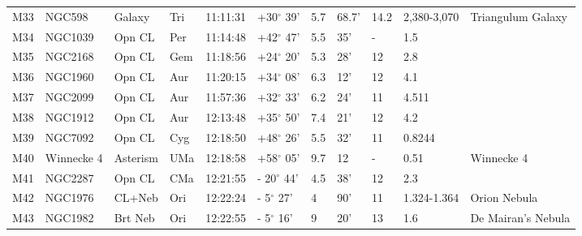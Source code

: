 \documentclass[10pt,twoside,a4paper,english]{article}
\begin{document}
\begin{longtable}{@{}lllllllllll@{}}
M33        & NGC598      & Galaxy     & Tri       & 11:11:31 & +30$^{\circ}$ 39'  & 5.7       & 68.7'                & 14.2     & 2,380-3,070         & Triangulum Galaxy                         \\ 
M34        & NGC1039     & Opn CL     & Per       & 11:14:48 & +42$^{\circ}$ 47'  & 5.5       & 35'                  & -        & 1.5                 &                                           \\ 
M35        & NGC2168     & Opn CL     & Gem       & 11:18:56 & +24$^{\circ}$ 20'  & 5.3       & 28'                  & 12       & 2.8                 &                                           \\ 
M36        & NGC1960     & Opn CL     & Aur       & 11:20:15 & +34$^{\circ}$ 08'  & 6.3       & 12'                  & 12       & 4.1                 &                                           \\ 
M37        & NGC2099     & Opn CL     & Aur       & 11:57:36 & +32$^{\circ}$ 33'  & 6.2       & 24'                  & 11       & 4.511               &                                           \\ 
M38        & NGC1912     & Opn CL     & Aur       & 12:13:48 & +35$^{\circ}$ 50'  & 7.4       & 21'                  & 12       & 4.2                 &                                           \\ 
M39        & NGC7092     & Opn CL     & Cyg       & 12:18:50 & +48$^{\circ}$ 26'  & 5.5       & 32'                  & 11       & 0.8244              &                                           \\ 
M40        & Winnecke 4  & Asterism   & UMa       & 12:18:58 & +58$^{\circ}$ 05'  & 9.7       & 12                   & -        & 0.51                & Winnecke 4                                \\ 
M41        & NGC2287     & Opn CL     & CMa       & 12:21:55 & - 20$^{\circ}$ 44' & 4.5       & 38'                  & 12       & 2.3                 &                                           \\ 
M42        & NGC1976     & CL+Neb     & Ori       & 12:22:24 & - 5$^{\circ}$ 27'  & 4         & 90'                  & 11       & 1.324-1.364         & Orion Nebula                              \\ 
M43        & NGC1982     & Brt Neb    & Ori       & 12:22:55 & - 5$^{\circ}$ 16'  & 9         & 20'                  & 13       & 1.6                 & De Mairan's Nebula                        \\ 

\end{longtable}
\end{document}
